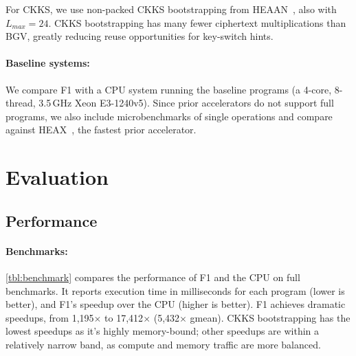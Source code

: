 
For CKKS, we use non-packed CKKS bootstrapping from HEA\-AN~\cite{cheon:eurocrypt2018:bootstrapping}, also with $L_{max} = 24$.
CKKS bootstrapping has many fewer ciphertext multiplications than BGV, greatly reducing
reuse opportunities for key-switch hints.



\paragraph{Baseline systems:}
We compare F1 with a CPU system running the baseline programs (a 4-core, 8-thread, 3.5\,GHz Xeon E3-1240v5).
Since prior accelerators do not support full programs, we also include microbenchmarks of single operations
and compare against HEAX~\cite{riazi:asplos20:heax}, the fastest prior accelerator.

\section{Evaluation}\label{sec:evaluation}
\subsection{Performance}\label{sec:perf}

\addtocounter{table}{-2}
\tblBenchmark
\addtocounter{table}{1}


\paragraph{Benchmarks:}
\autoref{tbl:benchmark} compares the performance of F1 and the CPU on full benchmarks.
It reports execution time in milliseconds for each program (lower is better), and F1's speedup over the CPU (higher is better).
F1 achieves dramatic speedups, from 1,195$\times$ to 17,412$\times$ (5,432$\times$ gmean).
CKKS bootstrapping has the lowest speedups as it's highly memory-bound;
other speedups are within a relatively narrow band, as compute and memory traffic are more balanced.

